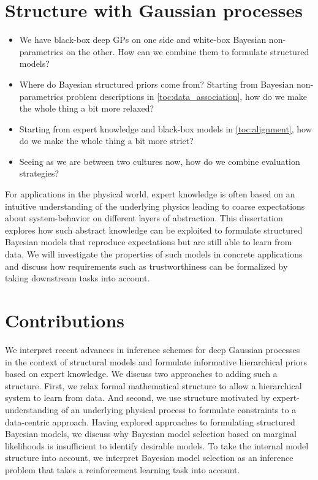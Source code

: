 \section{Structure with Gaussian processes}
\begin{itemize}
    \item We have black-box deep GPs on one side and white-box Bayesian non-parametrics on the other. How can we combine them to formulate structured models?
    \item Where do Bayesian structured priors come from? Starting from Bayesian non-parametrics problem descriptions in \cref{toc:data_association}, how do we make the whole thing a bit more relaxed?
    \item Starting from expert knowledge and black-box models in \cref{toc:alignment}, how do we make the whole thing a bit more strict?
    \item Seeing as we are between two cultures now, how do we combine evaluation strategies?
\end{itemize}
For applications in the physical world, expert knowledge is often based on an intuitive understanding of the underlying physics leading to coarse expectations about system-behavior on different layers of abstraction.
This dissertation explores how such abstract knowledge can be exploited to formulate structured Bayesian models that reproduce expectations but are still able to learn from data.
We will investigate the properties of such models in concrete applications and discuss how requirements such as trustworthiness can be formalized by taking downstream tasks into account.

\section{Contributions}
We interpret recent advances in inference schemes for deep Gaussian processes~\parencite{damianou_deep_2013} in the context of structural models and formulate informative hierarchical priors based on expert knowledge.
We discuss two approaches to adding such a structure.
First, we relax formal mathematical structure to allow a hierarchical system to learn from data.
And second, we use structure motivated by expert-understanding of an underlying physical process to formulate constraints to a data-centric approach.
Having explored approaches to formulating structured Bayesian models, we discuss why Bayesian model selection based on marginal likelihoods is insufficient to identify desirable models.
To take the internal model structure into account, we interpret Bayesian model selection as an inference problem that takes a reinforcement learning task into account.

